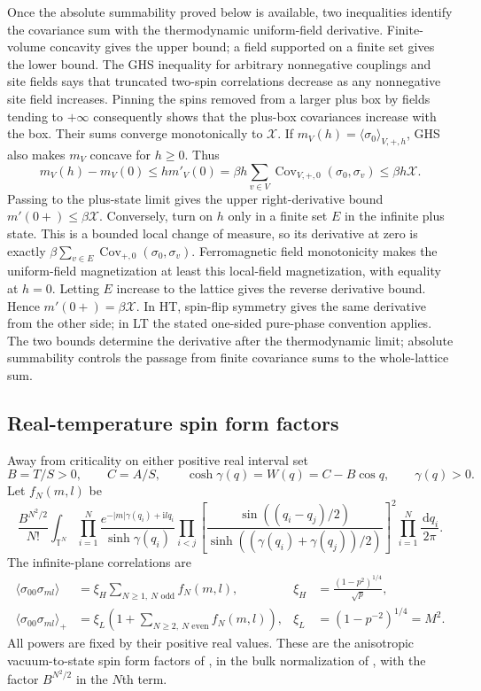 \documentclass[11pt]{article}
\numberwithin{equation}{section}
\theoremstyle{definition}
\newcommand{\T}{\mathbb T}
\newcommand{\dd}{\,\mathrm d}
\newcommand{\ii}{\mathrm i}
\begin{document}
Once the absolute summability proved below is available, two inequalities
identify the covariance sum with the thermodynamic uniform-field derivative.
Finite-volume concavity gives the upper bound; a field supported on a
finite set gives the lower bound. The GHS inequality for arbitrary
nonnegative couplings and site fields \cite[Theorem 1.5]{CGN} says that
truncated two-spin correlations decrease as any nonnegative site field
increases. Pinning the spins removed from a larger plus box by fields
tending to $+\infty$ consequently shows that the plus-box covariances
increase with the box. Their sums converge monotonically to $\mathcal X$.
If $m_V(h)=\langle\sigma_0\rangle_{V,+,h}$, GHS also makes $m_V$
concave for $h\ge0$. Thus
\[
 m_V(h)-m_V(0)\le h m'_V(0)
 =\beta h\sum_{v\in V}\operatorname{Cov}_{V,+,0}(\sigma_0,\sigma_v)
 \le\beta h\mathcal X.
\]
Passing to the plus-state limit gives the upper right-derivative bound
$m'(0+)\le\beta\mathcal X$. Conversely, turn on $h$ only in a finite
set $E$ in the infinite plus state. This is a bounded local change of
measure, so its derivative at zero is exactly
$\beta\sum_{v\in E}\operatorname{Cov}_{+,0}(\sigma_0,\sigma_v)$.
Ferromagnetic field monotonicity makes the uniform-field magnetization
at least this local-field magnetization, with equality at $h=0$.
Letting $E$ increase to the lattice gives the reverse derivative bound.
Hence $m'(0+)=\beta\mathcal X$. In HT, spin-flip symmetry gives the
same derivative from the other side; in LT the stated one-sided
pure-phase convention applies. The two bounds determine the derivative after the thermodynamic limit;
absolute summability controls the passage from finite covariance sums
to the whole-lattice sum.

\subsection{Real-temperature spin form factors}
Away from criticality on either positive real interval set
\[
 B=T/S>0,\qquad C=A/S,\qquad
 \cosh\gamma(q)=W(q)=C-B\cos q,\qquad \gamma(q)>0.
\]
Let $f_N(m,l)$ be
\begin{equation}\label{eq:corrFF}
 \frac{B^{N^2/2}}{N!}\int_{\T^N}
 \prod_{i=1}^N\frac{e^{-|m|\gamma(q_i)+\ii lq_i}}{\sinh\gamma(q_i)}
 \prod_{i<j}\left[
 \frac{\sin((q_i-q_j)/2)}{\sinh((\gamma(q_i)+\gamma(q_j))/2)}
 \right]^2\prod_{i=1}^N\frac{\dd q_i}{2\pi}.
\end{equation}
The infinite-plane correlations are
\begin{align}
 \langle\sigma_{00}\sigma_{ml}\rangle
   &=\xi_H\sum_{N\ge1,\ N\text{ odd}}f_N(m,l),
   &\xi_H&=\frac{(1-p^2)^{1/4}}{\sqrt p},\label{eq:HTcorr}\\
 \langle\sigma_{00}\sigma_{ml}\rangle_+
   &=\xi_L\left(1+\sum_{N\ge2,\ N\text{ even}}f_N(m,l)\right),
   &\xi_L&=(1-p^{-2})^{1/4}=M^2.\label{eq:LTcorr}
\end{align}
All powers are fixed by their positive real values. These are the
anisotropic vacuum-to-state spin form factors of
\cite{BL,IL}, in the bulk normalization of \cite{ONGP}, with the factor
$B^{N^2/2}$ in the $N$th term.
\end{document}
